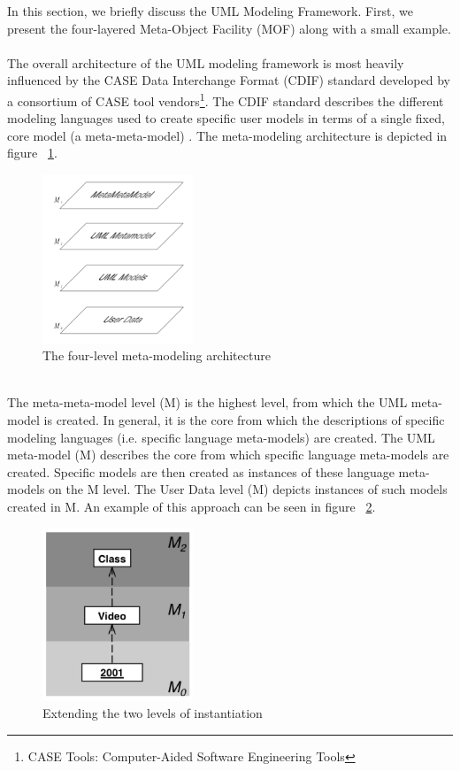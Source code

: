 In this section, we briefly discuss the UML Modeling Framework. First, we present the four-layered Meta-Object Facility (MOF) along with a small example. \\ \\
The overall architecture of the UML modeling framework is most heavily influenced by the CASE Data Interchange Format (CDIF) standard developed by a consortium of CASE tool vendors\footnote{CASE Tools: Computer-Aided Software Engineering Tools}. The CDIF standard describes the different modeling languages used to create specific user models in terms of a single fixed, core model (a meta-meta-model) \cite{RearchitectingUML}. The meta-modeling architecture is depicted in figure ~\ref{fig:mm_architecture}.
\begin{figure}[h!]
\centering
\includegraphics[width=0.4\textwidth]{images/mm_architecture.png}
\caption{The four-level meta-modeling architecture \cite{RearchitectingUML}}
\label{fig:mm_architecture}
\end{figure} \\
The meta-meta-model level (M) is the highest level, from which the UML meta-model is created. In general, it is the core from which the descriptions of specific modeling languages (i.e. specific language meta-models) are created. The UML meta-model (M) describes the core from which specific language meta-models are created. Specific models are then created as instances of these language meta-models on the M level. The User Data level (M) depicts instances of such models created in M. An example of this approach can be seen in figure ~\ref{fig:two_level_inst}.
\begin{figure}[h!]
\centering
\includegraphics[width=0.4\textwidth]{images/chap2_two_level_inst.png}
\caption{Extending the two levels of instantiation \cite{RearchitectingUML}}
\label{fig:two_level_inst}
\end{figure}

